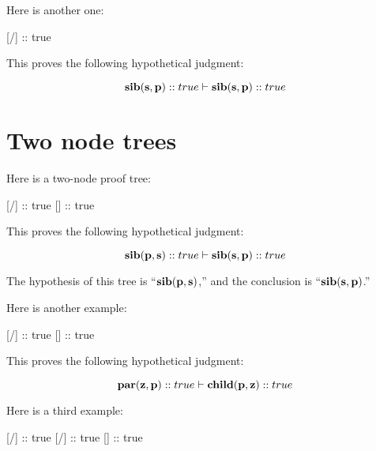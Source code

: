 \documentclass[../../../main.tex]{subfiles}
\begin{document}
Here is another one:

\begin{prooftree*}
  \hypo{}
  [\startrule/]{ :: true}
\end{prooftree*}

\noindent
This proves the following hypothetical judgment:

\begin{equation*}
  \nd{sib(s, p)} :: true \ndturnstile/ \nd{sib(s, p)} :: true
\end{equation*}


\section{Two node trees}

Here is a two-node proof tree:

\begin{prooftree*}
  \hypo{}
  [\startrule/]{ :: true}
  []{ :: true}
\end{prooftree*}

\noindent
This proves the following hypothetical judgment:

\begin{equation*}
  \nd{sib(p, s)} :: true \ndturnstile/ \nd{sib(s, p)} :: true
\end{equation*}

\noindent
The hypothesis of this tree is ``$\mathbf{sib(p, s)}$,'' and the conclusion is ``$\mathbf{sib(s, p)}$.''

Here is another example:

\begin{prooftree*}
  \hypo{}
  [\startrule/]{ :: true}
  []{ :: true}
\end{prooftree*}

\noindent
This proves the following hypothetical judgment:

\begin{equation*}
  \nd{par(z, p)} :: true \ndturnstile/ \nd{child(p, z)} :: true
\end{equation*}

\noindent
Here is a third example:

\begin{prooftree*}
  \hypo{}
  [\startrule/]{ :: true}
  \hypo{}
  [\startrule/]{ :: true}
  []{ :: true}
\end{prooftree*}
\end{document}
